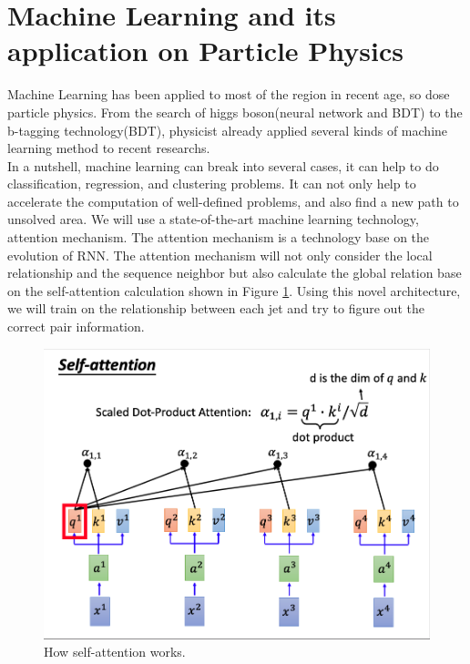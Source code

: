 \section{Machine Learning and its application on Particle Physics}

Machine Learning has been applied to most of the region in recent age, so dose particle physics. From the search of higgs boson(neural network and BDT) to the b-tagging technology(BDT\cite{Paganini:2017dpd}), physicist already applied several kinds of machine learning method to recent researchs.
\\
In a nutshell, machine learning can break into several cases, it can help to do classification, regression, and clustering problems. It can not only help to accelerate the computation of well-defined problems, and also find a new path to unsolved area. We will use a state-of-the-art machine learning technology, attention mechanism. The attention mechanism is a technology base on the evolution of RNN.\cite{A.Vaswani:2017} The attention mechanism will not only consider the local relationship and the sequence neighbor but also calculate the global relation base on the self-attention calculation shown in Figure \ref{fig:attention}. Using this novel architecture, we will train on the relationship between each jet and try to figure out the correct pair information.
\\
\begin{figure}[h]
	\centering
	\includegraphics[width=0.8\linewidth]{Figures/attention.png}
	\caption{How self-attention works.\cite{HY.Lee:2019}}
	\label{fig:attention}
\end{figure}
